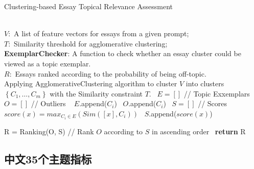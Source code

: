 \documentclass[11pt]{article}
\begin{document}
\begin{CJK}{UTF8}{gkai}
\begin{algorithm}[htbp]
    \caption{Clustering-based Essay Topical Relevance Assessment}
    \label{}
    \begin{algorithmic}[1]
        \REQUIRE ~~\\ %
            $V:$ A list of feature vectors for essays from a given prompt; \\
            $T:$ Similarity threshold for agglomerative clustering; \\
            \textbf{ExemplarChecker}: A function to check whether an essay cluster could be viewed as a topic exemplar.
        \ENSURE ~~\\ %
            $R:$ Essays ranked according to the probability of being off-topic. \\ 
        \STATE Applying AgglomerativeClustering algorithm to cluster $V$ into clusters $\left\{C_{1}, \ldots, C_{m}\right\}$ with the Similarity constraint $T$. \
        \STATE $E=[]$ // Topic Exxemplars \
        \STATE $O=[]$ // Outliers \
                \STATE $E$.append($C_{i}$)\
            \ELSE
                \STATE $O$.append($C_{i}$)\
            \ENDIF
        \ENDFOR
        \STATE $S=[]$ // Scores \
            \STATE $score(x)=max_{C_i \in E}(Sim([x], C_i))$ \
            \STATE $S$.append($score(x)$) \
        \ENDFOR

        \STATE R = Ranking(O, S) // Rank $O$ according to $S$ in ascending order \
        \STATE \textbf{return} R\
    \end{algorithmic}
\end{algorithm}

\subsection{中文35个主题指标}


\end{CJK}
\end{document}
